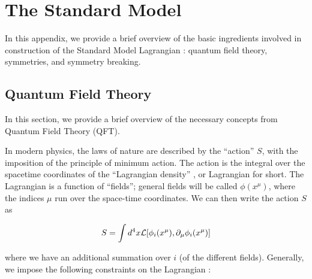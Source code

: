 

\chapter[Quantum Field Theory and Symmetries][Top of Page Title]{The Standard Model}
\label{app:qft_symmetries}

In this appendix, we provide a brief overview of the basic ingredients involved in construction of the Standard Model Lagrangian : quantum field theory, symmetries, and symmetry breaking.

\section{Quantum Field Theory}


In this section, we provide a brief overview of the necessary concepts from Quantum Field Theory (QFT).

In modern physics, the laws of nature are described by the ``action'' $S$, with the imposition of the principle of minimum action. 
The action is the integral over the spacetime coordinates of the ``Lagrangian density'' \Lagr, or Lagrangian for short.
The Lagrangian is a function of ``fields''; general fields will be called $\phi(x^\mu)$, where the indices $\mu$ run over the space-time coordinates.
We can then write the action $S$ as

\begin{equation}
S = \int d^4 x \mathcal{L}[ \phi_i(x^\mu) , \partial_\mu \phi_i(x^\mu)]
\end{equation}

where we have an additional summation over $i$ (of the different fields).
Generally, we impose the following constraints on the Lagrangian :

